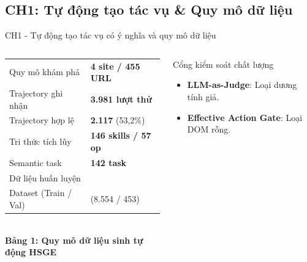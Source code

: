 \subsection{CH1: Tự động tạo tác vụ \& Quy mô dữ liệu}
\begin{frame}{CH1 - Tự động tạo tác vụ có ý nghĩa và quy mô dữ liệu}

  \begin{columns}[t,onlytextwidth]
    \begin{column}{0.53\textwidth}
      \vspace{-0.15cm}
      \setlength{\tabcolsep}{3pt}
      \begin{table}
        \scriptsize
        \begin{tabular}{@{}L{3.9cm} R{2.3cm}@{}}
          \toprule
          Quy mô khám phá & \textbf{4 site / 455 URL} \\
          Trajectory ghi nhận & \textbf{3.981 lượt thử} \\
          Trajectory hợp lệ & \textbf{2.117} (53,2\%) \\
          \midrule
          Tri thức tích lũy & \textbf{146 skills / 57 op} \\
          Semantic task & \textbf{142 task} \\
          \midrule
          Dữ liệu huấn luyện &  \\
          Dataset (Train / Val) &  (8.554 / 453) \\
          \bottomrule
        \end{tabular}
        \vspace{0.04cm}
        \centering
        \\ \scriptsize \textbf{Bảng 1: Quy mô dữ liệu sinh tự động HSGE}
      \end{table}
    \end{column}
    \hfill
    \begin{column}{0.45\textwidth}
      \vspace{-0.15cm}
      \begin{block}{Cổng kiểm soát chất lượng}
        \begin{itemize}\scriptsize\setlength{\itemsep}{0.5pt}
          \item \textbf{LLM-as-Judge}: Loại  dương tính giả.
          \item \textbf{Effective Action Gate}: Loại  DOM rỗng.
        \end{itemize}
      \end{block}


\end{column}
\end{columns}
\end{frame}
